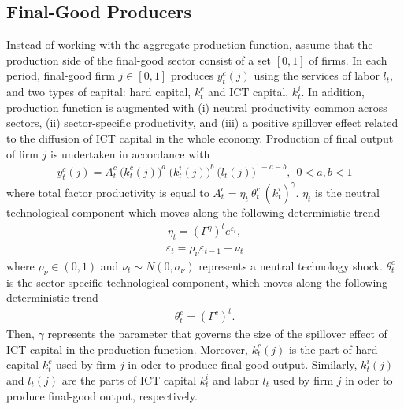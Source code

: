 \documentclass[12pt]{article}
\begin{document}
\subsection{Final-Good Producers}

Instead of working with the aggregate production function, assume that the production side of the final-good sector consist of a set $[0,1]$ of firms. In each period, final-good firm $j \in [0,1]$ produces $y^c_t(j)$ using the services of labor $l_{t}$, and two types of capital: hard capital, $k^c_{t}$ and ICT capital, $k^i_{t}$. In addition, production function is augmented with (i) neutral productivity common across sectors, (ii) sector-specific productivity, and (iii) a positive spillover effect related to the diffusion of ICT capital in the whole economy. Production of final output of firm $j$ is undertaken in accordance with
\begin{eqnarray}\label{equation:production_FINAL}
y^c_t(j) = A^c_t \ \big( k^c_{t}(j) \big)^a \ \big( k^i_{t}(j) \big)^b \ \big( l_{t}(j) \big)^{1-a-b}, \ \ 0 < a,b < 1
\end{eqnarray}
where total factor productivity is equal to $ A_t^c = \eta_t \ \theta^c_t \ (k^i_{t})^{\gamma} $. $\eta_t$ is the neutral technological component which moves along the following deterministic trend
\begin{eqnarray}\label{equation:neutral_tech_process}
\eta_t = (\Gamma^{\eta})^t e^{\varepsilon_t},  
\end{eqnarray} 
\begin{eqnarray}\label{equation:neutral_tech_shock}
 \varepsilon_t = \rho_{\nu} \varepsilon_{t-1} + \nu_t
\end{eqnarray} 
where $\rho_{\nu} \in (0,1)$ and $\nu_t \sim N(0,\sigma_{\nu})$ represents a neutral technology shock. $\theta^c_t$ is the sector-specific technological component,  which moves along the following deterministic trend
\begin{eqnarray}
\theta_t^c = (\Gamma^{c})^t.
\end{eqnarray} 
Then, $\gamma$ represents the parameter that governs the size of the spillover effect of ICT capital in the production function. Moreover, $k^c_{t}(j)$ is the part of hard capital $k^c_t$ used by firm $j$ in oder to produce final-good output. Similarly, $k^i_{t}(j)$ and $l_{t}(j)$ are the parts of ICT capital $k^i_t$ and labor $l_t$ used by firm $j$ in oder to produce final-good output, respectively. 
\end{document}

